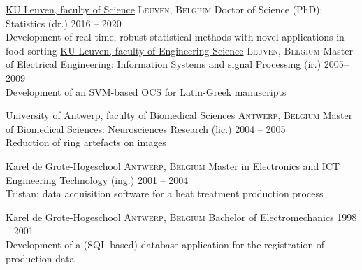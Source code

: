 \documentclass[10pt,a4paper]{article}
\begin{document}
\vspace{+1em} 


\spacedhrule{-0.2em}{-0.4em}
{}

\headedsection
  {\href{https://wet.kuleuven.be/english}{KU Leuven, faculty of Science}}
  {\textsc{Leuven, Belgium}} {%
  \headedsubsection
    {Doctor of Science (PhD): Statistics (dr.)}
    {2016 -- 2020}{\\Development of real-time, robust statistical methods with novel applications in food sorting}
}
\vspace{+0.2em}
\headedsection
  {\href{https://eng.kuleuven.be/en}{KU Leuven, faculty of Engineering Science}}
  {\textsc{Leuven, Belgium}} {%
  \headedsubsection
    {Master of Electrical Engineering: Information Systems and signal Processing (ir.)}
    {2005--2009} {\\Development of an SVM-based OCS for Latin-Greek manuscripts}
}

\vspace{+0.2em}
\headedsection
  {\href{https://www.uantwerpen.be/en/}{University of Antwerp, faculty of Biomedical Sciences}}
  {\textsc{Antwerp, Belgium}} {%
  \headedsubsection
    {Master of Biomedical Sciences: Neurosciences Research (lic.)}
    {2004 -- 2005} {\\Reduction of ring artefacts on  images}
}

\vspace{+0.2em}
\headedsection
{\href{https://www.kdg.be/}{Karel de Grote-Hogeschool}}
{\textsc{Antwerp, Belgium}} {%
	\headedsubsection
	{Master in Electronics and ICT Engineering Technology (ing.)}
	{2001 -- 2004} {\\Tristan: data acquisition software for a heat treatment production process}
}

\vspace{+0.2em}
\headedsection
{\href{https://www.kdg.be/}{Karel de Grote-Hogeschool}}
{\textsc{Antwerp, Belgium}} {%
	\headedsubsection
	{Bachelor of Electromechanics}
	{1998 -- 2001} {\\Development of a (SQL-based) database application for the registration of production data}
}
\end{document}
